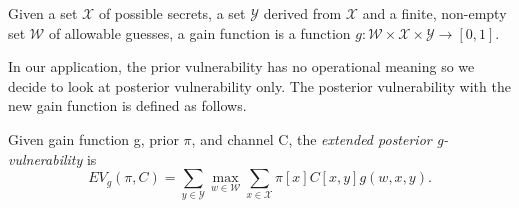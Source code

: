 \begin{definition}
Given a set $\mathcal{X}$ of possible secrets, a set $\mathcal{Y}$ derived from $\mathcal{X}$ and a finite, non-empty set $\mathcal{W}$ of allowable guesses, a gain function is a function $g: \mathcal{W} \times \mathcal{X} \times \mathcal{Y} \rightarrow [0,1]$.
\end{definition}
 
In our application, the prior vulnerability has no operational meaning so we decide to look at posterior vulnerability only. The posterior vulnerability with the new gain function is defined as follows.

\begin{definition}
	Given gain function g, prior $\pi$, and channel C, the \textit{extended posterior g-vulnerability} is
	\begin{equation}
	EV_{g}(\pi, C) = \sum_{y \in {\mathcal{Y}}} \max_{w \in {\mathcal{W}}} \sum_{x \in {\mathcal{X}}} \pi [x] C[x, y] g(w, x, y).
	\end{equation}
\end{definition}